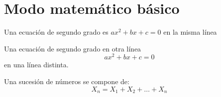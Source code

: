 \documentclass[10pt,a4paper]{article}
\begin{document}
\section{Modo matemático básico}
Una ecuación de segundo grado es 
$ax^2+bx+c=0$ en la misma línea

Una ecuación de segundo grado en otra línea
$$ax^2+bx+c=0$$ en una línea distinta.

Una sucesión de números se compone de:
$$ X_n = X_1 + X_2 + \ldots + X_n $$
\end{document}
